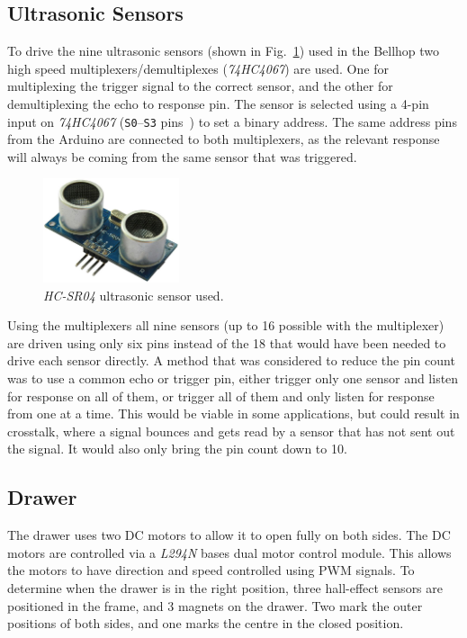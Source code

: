 \documentclass[11pt]{article}
\begin{document}
\subsection*{Ultrasonic Sensors}
To drive the nine ultrasonic sensors (shown in Fig.~\ref{hc-sr04}) used in the Bellhop two high speed multiplexers/demultiplexes (\textit{74HC4067}) are used.  One for multiplexing the trigger signal to the correct sensor, and the other for demultiplexing the echo to response pin. The sensor is selected using a 4-pin input on \textit{74HC4067} (\texttt{S0}--\texttt{S3} pins~\cite{multiplexer-datasheet}) to set a binary address. The same address pins from the Arduino are connected to both multiplexers, as the relevant response will always be coming from the same sensor that was triggered.

\begin{figure}
	\includegraphics[width=4cm]{hc-sr04.jpg}
	\caption{\textit{HC-SR04} ultrasonic sensor used.}
	\label{hc-sr04}
\end{figure}

Using the multiplexers all nine sensors (up to 16 possible with the multiplexer) are driven using only six pins instead of the 18 that would have been needed to drive each sensor directly. A method that was considered to reduce the pin count was to use a common echo or trigger pin, either trigger only one sensor and listen for response on all of them, or trigger all of them and  only listen for response from one at a time. This would be viable in some applications, but could result in crosstalk, where a signal bounces and gets read by a sensor that has not sent out the signal. It would also only bring the pin count down to 10.

\subsection*{Drawer}
The drawer uses two DC motors to allow it to open fully on both sides. The DC motors are controlled via a \textit{L294N} bases dual motor control module. This allows the motors to have direction and speed controlled using PWM signals. To determine when the drawer is in the right position, three hall-effect sensors are positioned in the frame, and 3 magnets on the drawer. Two mark the outer positions of both sides, and one marks the centre in the closed position.
\end{document}
